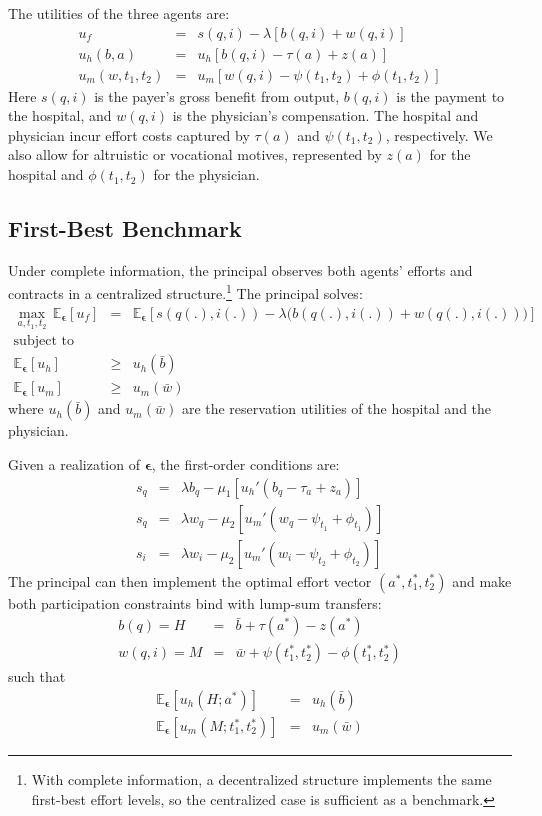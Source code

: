 ﻿\documentclass[12pt,letterpaper]{article}
\begin{document}
The utilities of the three agents are:
\begin{eqnarray*}\label{utilen}
u_f &=& s(q,i)-\lambda[b(q,i)+w(q,i)]\\
u_h(b,a) &=& u_h[b(q,i)-\tau(a)+z(a)]\\
u_m(w,t_1,t_2) &=& u_m[w(q,i)-\psi(t_1,t_2)+\phi(t_1,t_2)]
\end{eqnarray*}
Here $s(q,i)$ is the payer's gross benefit from output, $b(q,i)$ is the payment to the hospital, and $w(q,i)$ is the physician's compensation. The hospital and physician incur effort costs captured by $\tau(a)$ and $\psi(t_1,t_2)$, respectively. We also allow for altruistic or vocational motives, represented by $z(a)$ for the hospital and $\phi(t_1,t_2)$ for the physician.

\subsection{First-Best Benchmark}
Under complete information, the principal observes both agents' efforts and contracts in a centralized structure.\footnote{With complete information, a decentralized structure implements the same first-best effort levels, so the centralized case is sufficient as a benchmark.} The principal solves:
\begin{eqnarray*}\label{maxf0en}
\nonumber \max\limits_{a,t_1,t_2}\,
\mathbb{E}_{\bm{\epsilon}}[u_f]
&=&
\mathbb{E}_{\bm{\epsilon}}
\left[
s(q(.),i(.))-\lambda\big(b(q(.),i(.))+w(q(.),i(.))\big)
\right]\\
\nonumber \text{subject to }\\
\mathbb{E}_{\bm{\epsilon}}[u_h] &\geq& u_h(\bar{b})\\
\mathbb{E}_{\bm{\epsilon}}[u_m] &\geq& u_m(\bar{w})
\end{eqnarray*}
where $u_h(\bar{b})$ and $u_m(\bar{w})$ are the reservation utilities of the hospital and the physician.

Given a realization of $\bm{\epsilon}$, the first-order conditions are:
\begin{eqnarray*}
  s_q &=& \lambda b_q-\mu_1[u_h'(b_q-\tau_a+z_a)]\\
  s_q &=& \lambda w_q-\mu_2[u_m'(w_q-\psi_{t_1}+\phi_{t_1})]\\
  s_i &=& \lambda w_i-\mu_2[u_m'(w_i-\psi_{t_2}+\phi_{t_2})]
\end{eqnarray*}
The principal can then implement the optimal effort vector $(a^*,t_1^*,t_2^*)$ and make both participation constraints bind with lump-sum transfers:
\begin{eqnarray*}
b(q)=H &=& \bar{b}+\tau(a^*)-z(a^*)\\
w(q,i)=M &=& \bar{w}+\psi(t_1^*,t_2^*)-\phi(t_1^*,t_2^*)
\end{eqnarray*}
such that
\begin{eqnarray*}
\mathbb{E}_{\bm{\epsilon}}[u_h(H;a^*)] &=& u_h(\bar{b})\\
\mathbb{E}_{\bm{\epsilon}}[u_m(M;t_1^*,t_2^*)] &=& u_m(\bar{w})
\end{eqnarray*}
\end{document}
